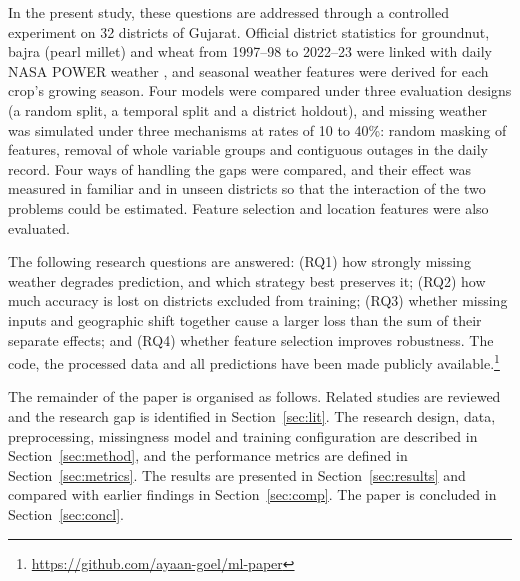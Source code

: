 In the present study, these questions are addressed through a controlled experiment on 32
districts of Gujarat. Official district statistics for groundnut, bajra (pearl millet) and wheat
from 1997--98 to 2022--23 \cite{desapy} were linked with daily NASA POWER weather \cite{nasapower},
and seasonal weather features were derived for each crop's growing season. Four models were
compared under three evaluation designs (a random split, a temporal split and a district
holdout), and missing weather was simulated under three mechanisms at rates of 10 to 40\%:
random masking of features, removal of whole variable groups and contiguous outages in the daily
record. Four ways of handling the gaps were compared, and their effect was measured in familiar
and in unseen districts so that the interaction of the two problems could be estimated.
Feature selection and location features were also evaluated.

The following research questions are answered: (RQ1) how strongly missing weather degrades
prediction, and which strategy best preserves it; (RQ2) how much accuracy is lost on districts
excluded from training; (RQ3) whether missing inputs and geographic shift together cause a larger
loss than the sum of their separate effects; and (RQ4) whether feature selection improves
robustness. The code, the processed data and all predictions have been made publicly
available.\footnote{\url{https://github.com/ayaan-goel/ml-paper}}

The remainder of the paper is organised as follows. Related studies are reviewed and the research
gap is identified in Section~\ref{sec:lit}. The research design, data, preprocessing, missingness
model and training configuration are described in Section~\ref{sec:method}, and the performance
metrics are defined in Section~\ref{sec:metrics}. The results are presented in
Section~\ref{sec:results} and compared with earlier findings in Section~\ref{sec:comp}. The paper
is concluded in Section~\ref{sec:concl}.
